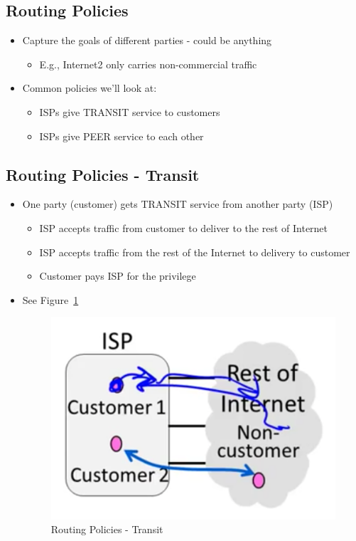 \documentclass[12pt]{ctexart}   %
\begin{document}
	\subsection{Routing Policies}
	\begin{itemize}
		\item Capture the goals of different parties - could be anything
		\begin{itemize}
			\item E.g., Internet2 only carries non-commercial traffic
		\end{itemize}
		\item Common policies we'll look at:
		\begin{itemize}
			\item ISPs give TRANSIT service to customers
			\item ISPs give PEER service to each other
		\end{itemize}
	\end{itemize}
	
	\subsection{Routing Policies - Transit}
	\begin{itemize}
		\item One party (customer) gets TRANSIT service from another party (ISP)
		\begin{itemize}
			\item ISP accepts traffic from customer to deliver to the rest of Internet
			\item ISP accepts traffic from the rest of the Internet to delivery to customer
			\item Customer pays ISP for the privilege
		\end{itemize}
		\item See Figure~\ref{fig:5-11-4}
			
		\begin{figure}[h!] %
		\centering
		 \includegraphics[scale=0.7]{images/5-11-4}
		\caption{ Routing Policies - Transit }
		 \label{fig:5-11-4}
		 \end{figure}
	\end{itemize}
	
\end{document}
